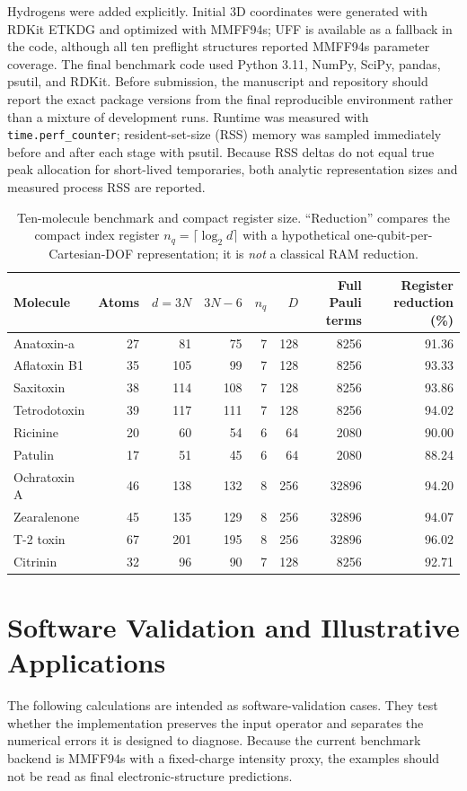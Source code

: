 \documentclass[aip,jcp,reprint,amsmath,amssymb,floatfix]{revtex4-2}
\begin{document}
Hydrogens were added explicitly. Initial 3D coordinates were generated with RDKit ETKDG and optimized with MMFF94s; UFF is available as a fallback in the code, although all ten preflight structures reported MMFF94s parameter coverage.\cite{Halgren1996} The final benchmark code used Python 3.11, NumPy, SciPy, pandas, psutil, and RDKit. Before submission, the manuscript and repository should report the exact package versions from the final reproducible environment rather than a mixture of development runs. Runtime was measured with \texttt{time.perf\_counter}; resident-set-size (RSS) memory was sampled immediately before and after each stage with psutil. Because RSS deltas do not equal true peak allocation for short-lived temporaries, both analytic representation sizes and measured process RSS are reported.

\begin{table}[t]
\caption{Ten-molecule benchmark and compact register size. ``Reduction'' compares the compact index register $n_q=\lceil\log_2 d\rceil$ with a hypothetical one-qubit-per-Cartesian-DOF representation; it is \emph{not} a classical RAM reduction.}
\label{tab:benchmark}
\centering
\scriptsize
\begin{tabular}{lrrrrrrr}
\toprule
Molecule & Atoms & $d=3N$ & $3N-6$ & $n_q$ & $D$ & Full Pauli terms & Register reduction (\%)\\
\midrule
Anatoxin-a     & 27 & 81  & 75  & 7 & 128 & 8256  & 91.36\\
Aflatoxin B1   & 35 & 105 & 99  & 7 & 128 & 8256  & 93.33\\
Saxitoxin      & 38 & 114 & 108 & 7 & 128 & 8256  & 93.86\\
Tetrodotoxin   & 39 & 117 & 111 & 7 & 128 & 8256  & 94.02\\
Ricinine       & 20 & 60  & 54  & 6 & 64  & 2080  & 90.00\\
Patulin        & 17 & 51  & 45  & 6 & 64  & 2080  & 88.24\\
Ochratoxin A   & 46 & 138 & 132 & 8 & 256 & 32896 & 94.20\\
Zearalenone    & 45 & 135 & 129 & 8 & 256 & 32896 & 94.07\\
T-2 toxin      & 67 & 201 & 195 & 8 & 256 & 32896 & 96.02\\
Citrinin       & 32 & 96  & 90  & 7 & 128 & 8256  & 92.71\\
\bottomrule
\end{tabular}
\end{table}

\section{Software Validation and Illustrative Applications}
The following calculations are intended as software-validation cases. They test whether the implementation preserves the input operator and separates the numerical errors it is designed to diagnose. Because the current benchmark backend is MMFF94s with a fixed-charge intensity proxy, the examples should not be read as final electronic-structure predictions.
\end{document}
